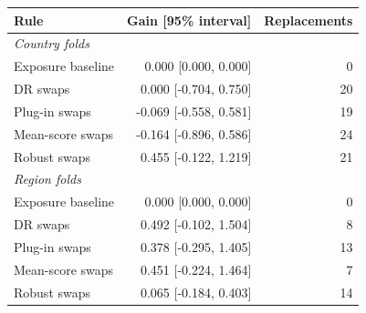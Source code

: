 \begin{tabular}{lrr}
\toprule
Rule & Gain [95\% interval] & Replacements \\
\midrule
\multicolumn{3}{l}{\emph{Country folds}} \\
Exposure baseline & 0.000 [0.000, 0.000] & 0 \\
DR swaps & 0.000 [-0.704, 0.750] & 20 \\
Plug-in swaps & -0.069 [-0.558, 0.581] & 19 \\
Mean-score swaps & -0.164 [-0.896, 0.586] & 24 \\
Robust swaps & 0.455 [-0.122, 1.219] & 21 \\
\midrule
\multicolumn{3}{l}{\emph{Region folds}} \\
Exposure baseline & 0.000 [0.000, 0.000] & 0 \\
DR swaps & 0.492 [-0.102, 1.504] & 8 \\
Plug-in swaps & 0.378 [-0.295, 1.405] & 13 \\
Mean-score swaps & 0.451 [-0.224, 1.464] & 7 \\
Robust swaps & 0.065 [-0.184, 0.403] & 14 \\
\bottomrule
\end{tabular}
